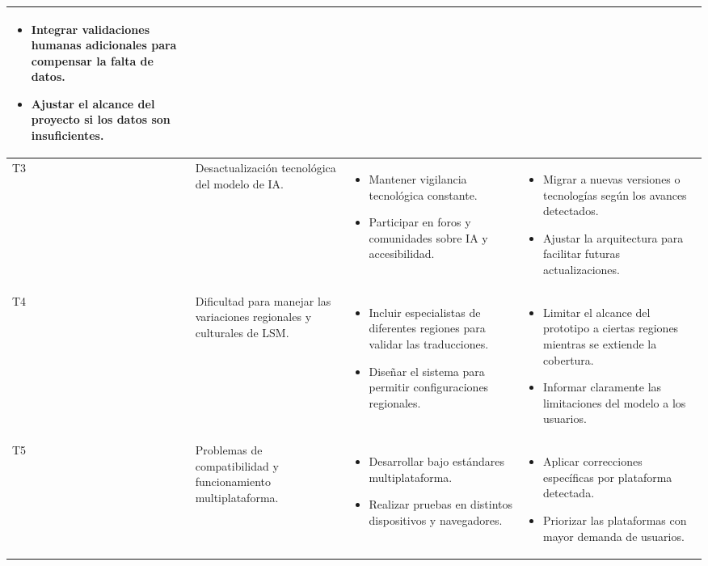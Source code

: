 \begin{longtable}{|>{\centering\arraybackslash}p{0.7cm}|>{\raggedright\arraybackslash}p{4cm}|>{\raggedright\arraybackslash}p{5.5cm}|>{\raggedright\arraybackslash}p{5.5cm}|}
\begin{itemize}
		\item Integrar validaciones humanas adicionales para compensar la falta de datos.
		\item Ajustar el alcance del proyecto si los datos son insuficientes.
	\end{itemize} \\
	\hline
	T3 & Desactualización tecnológica del modelo de IA. &
	\begin{itemize}
		\item Mantener vigilancia tecnológica constante.
		\item Participar en foros y comunidades sobre IA y accesibilidad.
	\end{itemize} &
	\begin{itemize}
		\item Migrar a nuevas versiones o tecnologías según los avances detectados.
		\item Ajustar la arquitectura para facilitar futuras actualizaciones.
	\end{itemize} \\
	\hline
	T4 & Dificultad para manejar las variaciones regionales y culturales de LSM. &
	\begin{itemize}
		\item Incluir especialistas de diferentes regiones para validar las traducciones.
		\item Diseñar el sistema para permitir configuraciones regionales.
	\end{itemize} &
	\begin{itemize}
		\item Limitar el alcance del prototipo a ciertas regiones mientras se extiende la cobertura.
		\item Informar claramente las limitaciones del modelo a los usuarios.
	\end{itemize} \\
	\hline
	T5 & Problemas de compatibilidad y funcionamiento multiplataforma. &
	\begin{itemize}
		\item Desarrollar bajo estándares multiplataforma.
		\item Realizar pruebas en distintos dispositivos y navegadores.
	\end{itemize} &
	\begin{itemize}
		\item Aplicar correcciones específicas por plataforma detectada.
		\item Priorizar las plataformas con mayor demanda de usuarios.
	\end{itemize} \\
	\hline
\end{longtable}

